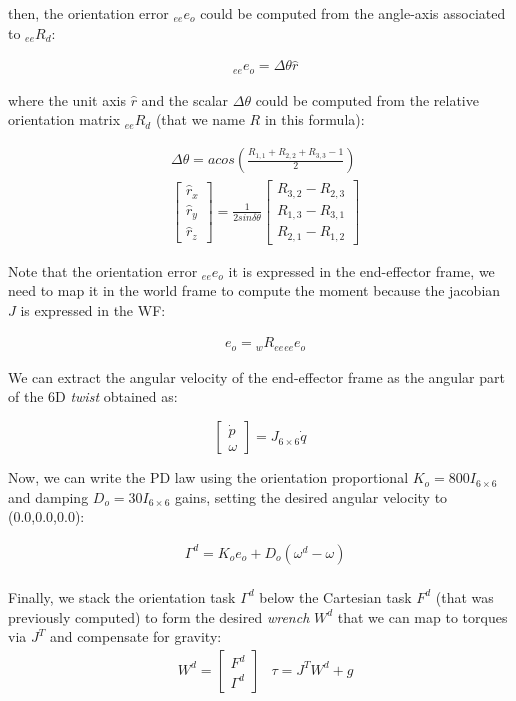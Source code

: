 \documentclass[11pt]{article}
\newcommand{\mat}[1]{\ensuremath{\begin{bmatrix}#1\end{bmatrix}}}	%
\begin{document}
then, the orientation error ${}_{ee}e_o$ could be computed from the angle-axis associated to ${}_{ee}R_d$:


\begin{align}
& {}_{ee}e_o = \Delta\theta \hat{r}
\end{align}

where the unit axis $\hat{r}$  and the scalar $\Delta \theta$ could be computed from 
the relative orientation matrix ${}_{ee}R_d$ (that we name $R$ in this formula): 

\begin{align}
& \Delta \theta = acos\left(\frac{R_{1,1} + R_{2,2} +R_{3,3} -1}{2}\right)\\
&\mat{\hat{r}_x \\ \hat{r}_y\\ \hat{r}_z} = \frac{1}{2sin \delta \theta} \mat{R_{3,2} - R_{2,3} \\R_{1,3} - R_{3,1}\\R_{2,1} - R_{1,2}}
\end{align}



Note that  the orientation error ${}_{ee}e_o$ it is expressed in the end-effector frame,
we need to map it in the world frame to compute the moment because the jacobian $J$ is expressed in the WF:

\begin{align}
&e_o = {}_wR_{ee} {}_{ee} e_o
\end{align}

We can extract the angular velocity of the end-effector frame as the angular part of the 6D \textit{twist} obtained as:

\begin{equation}
\mat{\dot{p}\\ \omega} = J_{6\times6} \dot{q}
\end{equation}

Now, we can write the PD law using the orientation proportional $K_{o} = 800I_{6\times6}$ and damping $D_o = 30I_{6\times6}$ gains, setting the desired angular velocity to (0.0,0.0,0.0): 

\begin{align}
& \Gamma^d  = K_{o} e_o  + D_o(\omega^d - \omega)  \\
\end{align}

Finally, we stack the orientation task $\Gamma^d$ below  the Cartesian task $F^d$ (that was previously computed) to form the desired \textit{wrench} $W^d$ that we can map to torques via $J^T$ and compensate for gravity:
\begin{align}
&W^d=\mat{F^d \\ \Gamma^d}
&\tau = J^TW^d + g
\end{align}
\end{document}
